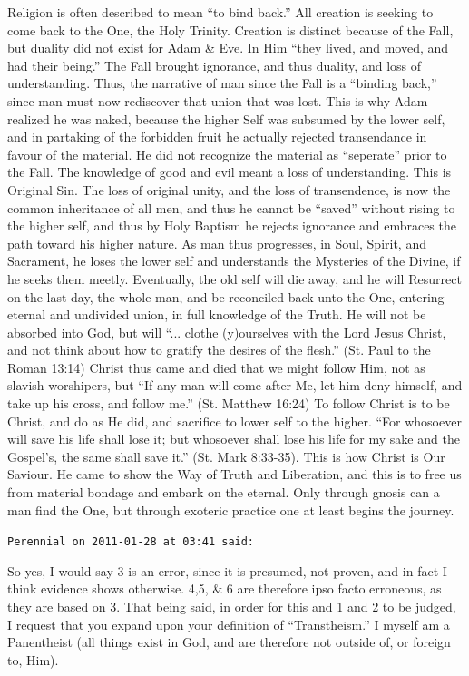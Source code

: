 \begin{footnotesize}
\begin{sffamily}
Religion is often described to mean ``to bind back.'' All creation is seeking to come back to the One, the Holy Trinity. Creation is distinct because of the Fall, but duality did not exist for Adam \& Eve. In Him ``they lived, and moved, and had their being.'' The Fall brought ignorance, and thus duality, and loss of understanding. Thus, the narrative of man since the Fall is a ``binding back,'' since man must now rediscover that union that was lost. This is why Adam realized he was naked, because the higher Self was subsumed by the lower self, and in partaking of the forbidden fruit he actually rejected transendance in favour of the material. He did not recognize the material as ``seperate'' prior to the Fall. The knowledge of good and evil meant a loss of understanding. This is Original Sin. The loss of original unity, and the loss of transendence, is now the common inheritance of all men, and thus he cannot be ``saved'' without rising to the higher self, and thus by Holy Baptism he rejects ignorance and embraces the path toward his higher nature. As man thus progresses, in Soul, Spirit, and Sacrament, he loses the lower self and understands the Mysteries of the Divine, if he seeks them meetly. Eventually, the old self will die away, and he will Resurrect on the last day, the whole man, and be reconciled back unto the One, entering eternal and undivided union, in full knowledge of the Truth. He will not be absorbed into God, but will ``... clothe (y)ourselves with the Lord Jesus Christ, and not think about how to gratify the desires of the flesh.'' (St. Paul to the Roman 13:14) Christ thus came and died that we might follow Him, not as slavish worshipers, but ``If any man will come after Me, let him deny himself, and take up his cross, and follow me.'' (St. Matthew 16:24) To follow Christ is to be Christ, and do as He did, and sacrifice to lower self to the higher. ``For whosoever will save his life shall lose it; but whosoever shall lose his life for my sake and the Gospel's, the same shall save it.'' (St. Mark 8:33-35). This is how Christ is Our Saviour. He came to show the Way of Truth and Liberation, and this is to free us from material bondage and embark on the eternal. Only through gnosis can a man find the One, but through exoteric practice one at least begins the journey.

\hfill

\texttt{Perennial on 2011-01-28 at 03:41 said:}

So yes, I would say 3 is an error, since it is presumed, not proven, and in fact I think evidence shows otherwise. 4,5, \& 6 are therefore ipso facto erroneous, as they are based on 3. That being said, in order for this and 1 and 2 to be judged, I request that you expand upon your definition of ``Transtheism.'' I myself am a Panentheist (all things exist in God, and are therefore not outside of, or foreign to, Him).


\end{sffamily}
\end{footnotesize}
